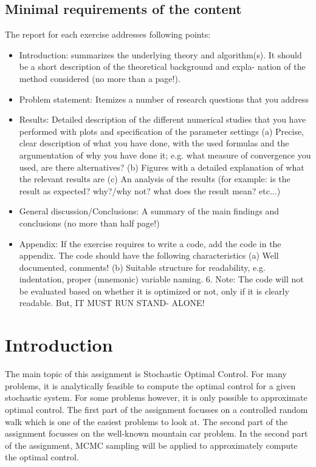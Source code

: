 \documentclass[10pt,a4paper]{article}
\begin{document}
\subsection{Minimal requirements of the content}
The report for each exercise addresses following points:
\begin{itemize}
\item Introduction: summarizes the underlying theory and algorithm(s). It should be a short description of the theoretical background and expla- nation of the method considered (no more than a page!).
\item Problem statement: Itemizes a number of research questions that you address
\item Results: Detailed description of the different numerical studies that you have performed with plots and specification of the parameter settings (a) Precise, clear description of what you have done, with the used formulas and the argumentation of why you have done it; e.g. what measure of convergence you used, are there alternatives? (b) Figures with a detailed explanation of what the relevant results are (c) An analysis of the results (for example: is the result as expected? why?/why not? what does the result mean? etc...)
\item General discussion/Conclusions: A summary of the main findings and conclusions (no more than half page!)
\item Appendix: If the exercise requires to write a code, add the code in the appendix. The code should have the following characteristics (a) Well documented, comments! (b) Suitable structure for readability, e.g. indentation, proper (mnemonic) variable naming. 6. Note: The code will not be evaluated based on whether it is optimized or not, only if it is clearly readable. But, IT MUST RUN STAND- ALONE!
\end{itemize}

\color{black}
\fi

\newpage
\section{Introduction}
The main topic of this assignment is Stochastic Optimal Control. For many problems, it is analytically feasible to compute the optimal control for a given stochastic system. For some problems however, it is only possible to approximate optimal control. The first part of the assignment focusses on a controlled random walk which is one of the easiest problems to look at. The second part of the assignment focusses on the well-known mountain car problem. In the second part of the assignment, MCMC sampling will be applied to approximately compute the optimal control.
\end{document}
